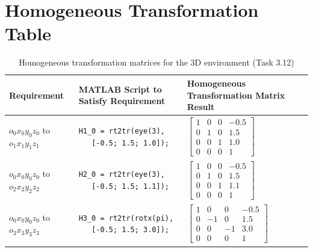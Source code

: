 \documentclass[11pt,a4paper]{article}
\begin{document}
\section{Homogeneous Transformation Table}

\begin{table}[H]
\centering
\begin{tabular}{|p{3cm}|p{6cm}|p{4cm}|}
\hline
\textbf{Requirement} & \textbf{MATLAB Script to Satisfy Requirement} & \textbf{Homogeneous Transformation Matrix Result} \\
\hline
$o_0x_0y_0z_0$ to $o_1x_1y_1z_1$ & 
\begin{lstlisting}[style=matlab, basicstyle=\tiny\ttfamily, frame=none, numbers=none]
H1_0 = rt2tr(eye(3), 
   [-0.5; 1.5; 1.0]);
\end{lstlisting} & 
$\begin{bmatrix}
1 & 0 & 0 & -0.5 \\
0 & 1 & 0 & 1.5 \\
0 & 0 & 1 & 1.0 \\
0 & 0 & 0 & 1
\end{bmatrix}$ \\
\hline
$o_0x_0y_0z_0$ to $o_2x_2y_2z_2$ & 
\begin{lstlisting}[style=matlab, basicstyle=\tiny\ttfamily, frame=none, numbers=none]
H2_0 = rt2tr(eye(3), 
   [-0.5; 1.5; 1.1]);
\end{lstlisting} & 
$\begin{bmatrix}
1 & 0 & 0 & -0.5 \\
0 & 1 & 0 & 1.5 \\
0 & 0 & 1 & 1.1 \\
0 & 0 & 0 & 1
\end{bmatrix}$ \\
\hline
$o_0x_0y_0z_0$ to $o_3x_3y_3z_3$ & 
\begin{lstlisting}[style=matlab, basicstyle=\tiny\ttfamily, frame=none, numbers=none]
H3_0 = rt2tr(rotx(pi), 
   [-0.5; 1.5; 3.0]);
\end{lstlisting} & 
$\begin{bmatrix}
1 & 0 & 0 & -0.5 \\
0 & -1 & 0 & 1.5 \\
0 & 0 & -1 & 3.0 \\
0 & 0 & 0 & 1
\end{bmatrix}$ \\
\hline
\end{tabular}
\caption{Homogeneous transformation matrices for the 3D environment (Task 3.12)}
\end{table}
\end{document}
